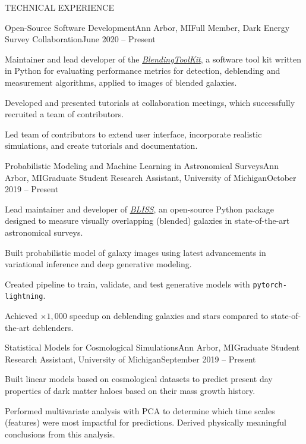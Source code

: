 \documentclass{resume} %
\newcommand{\pl}[0]{\texttt{pytorch-lightning}}
\begin{document}

\begin{rSection}{TECHNICAL EXPERIENCE}

\begin{rSubsection}{Open-Source Software Development}{Ann Arbor, MI}{Full Member, Dark Energy Survey Collaboration}{June 2020 -- Present}
\item Maintainer and lead developer of the \textit{\href{https://github.com/LSSTDESC/BlendingToolKit}{BlendingToolKit}}, a software tool kit written in Python for evaluating performance metrics for detection, deblending and measurement algorithms, applied to images of blended galaxies.

\item Developed and presented tutorials at collaboration meetings, which successfully recruited a team of contributors.

\item Led team of contributors to extend user interface, incorporate realistic simulations, and create tutorials and documentation.
\end{rSubsection}


\begin{rSubsection}{Probabilistic Modeling and Machine Learning in Astronomical Surveys}{Ann Arbor, MI}{Graduate Student Research Assistant, University of Michigan}{October 2019 -- Present}
\item Lead maintainer and developer of \textit{\href{https://github.com/prob-ml/bliss}{BLISS}}, an open-source Python package designed to measure visually overlapping (blended) galaxies in state-of-the-art astronomical surveys.
\item Built probabilistic model of galaxy images using latest advancements in variational inference and deep generative modeling.
\item Created pipeline to train, validate, and test generative models with \pl.
\item\textbf{} Achieved $\times 1,000$ speedup on deblending galaxies and stars compared to state-of-the-art deblenders.
\end{rSubsection}

\begin{rSubsection}{Statistical Models for Cosmological Simulations}{Ann Arbor, MI}{Graduate Student Research Assistant, University of Michigan}{September 2019 -- Present}
\item Built linear models based on cosmological datasets to predict present day properties of dark matter haloes based on their mass growth history. 
\item Performed multivariate analysis with PCA to determine which time scales (features) were most impactful for predictions. Derived physically meaningful conclusions from this analysis.
\end{rSubsection}


\end{rSection}
\end{document}
